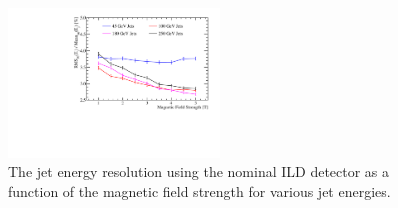 \begin{figure}
\includegraphics[width=0.5\textwidth]{OptimisationStudies/Plots/JetEnergyResolutions/JER_vs_MagneticFieldStrength.pdf}
\caption[The jet energy resolution using the nominal ILD detector as a function of the magnetic field strength for various jet energies.]{The jet energy resolution using the nominal ILD detector as a function of the magnetic field strength for various jet energies.}
\label{fig:bfield}
\end{figure}

